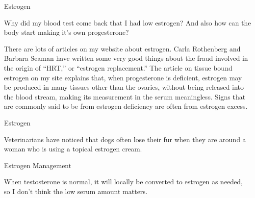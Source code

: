 \documentclass[11pt,oneside,openany,extrafontsizes]{memoir}
\begin{document}
\begin{qaexchange}{Estrogen}

    \begin{question}
        Why did my blood test come back that I had low estrogen? And also how can the body start making it's own progesterone?
    \end{question}

    \begin{answer}
        There are lots of articles on my website about estrogen. Carla Rothenberg and Barbara Seaman have written some very good things about the fraud involved in the origin of \enquote{HRT,} or \enquote{estrogen replacement.} The article on tissue bound estrogen on my site explains that, when progesterone is deficient, estrogen may be produced in many tissues other than the ovaries, without being released into the blood stream, making its measurement in the serum meaningless. Signs that are commonly said to be from estrogen deficiency are often from estrogen excess.
    \end{answer}
\end{qaexchange}

\begin{standalonequote}{Estrogen}

    \begin{answer}
        Veterinarians have noticed that dogs often lose their fur when they are around a woman who is using a topical estrogen cream.
    \end{answer}
\end{standalonequote}

\begin{standalonequote}{Estrogen Management}

    \begin{answer}
       When testosterone is normal, it will locally be converted to estrogen as needed, so I don't think the low serum amount matters. 
    \end{answer}
\end{standalonequote}
\end{document}
